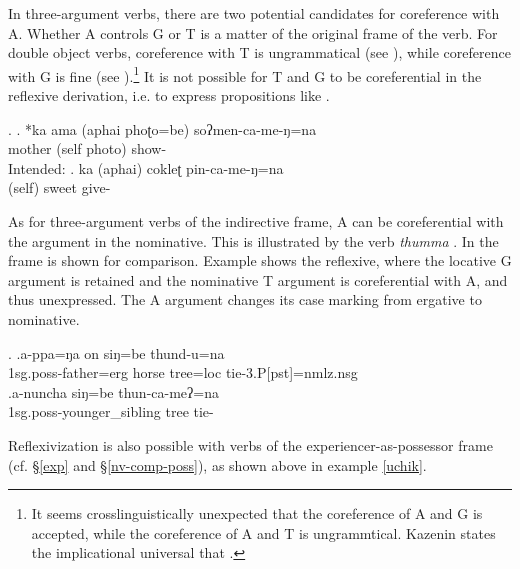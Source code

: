 In three-argument verbs, there are two potential candidates for coreference with A. Whether A controls G or T is a matter of the original frame of the verb. For double object verbs, coreference with T is ungrammatical (see \Next[a]), while coreference with G is fine (see \Next[b]).\footnote{It seems crosslinguistically unexpected that the coreference of A and G is accepted, while the coreference of A and T is ungrammtical. Kazenin states the implicational universal that  \citep[918]{Kazenin2001_Verbal}. } It is not possible for T and G to be coreferential in the reflexive derivation, i.e. to express propositions like .

\ex. \ag. *ka ama (aphai phoʈo=be)  soʔmen-ca-me-ŋ=na\\
 mother (self photo) show- \\
Intended: 
	\bg. ka (aphai) cokleʈ pin-ca-me-ŋ=na\\
		 (self) sweet give-\\


As for three-argument verbs of the indirective frame, A can be coreferential with the argument in the nominative. This is illustrated by the verb \emph{thumma} .  In \Next[a] the  frame is shown for comparison. Example \Next[b] shows the reflexive, where the locative G argument is retained and the nominative T argument is coreferential with A, and thus unexpressed. The A argument changes its case marking from ergative to nominative.  

\ex. \ag.a-ppa=ŋa on siŋ=be thund-u=na\\
		{\sc 1sg.poss}-father{\sc =erg} horse tree{\sc =loc} tie{\sc -3.P[pst]=nmlz.nsg}	\\
 	\bg.a-nuncha siŋ=be thun-ca-meʔ=na\\
{\sc 1sg.poss}-younger\_sibling tree tie-\\


Reflexivization is also possible with verbs of the experiencer-as-possessor frame (cf. §\ref{exp} and §\ref{nv-comp-poss}), as shown above in example \ref{uchik}.


